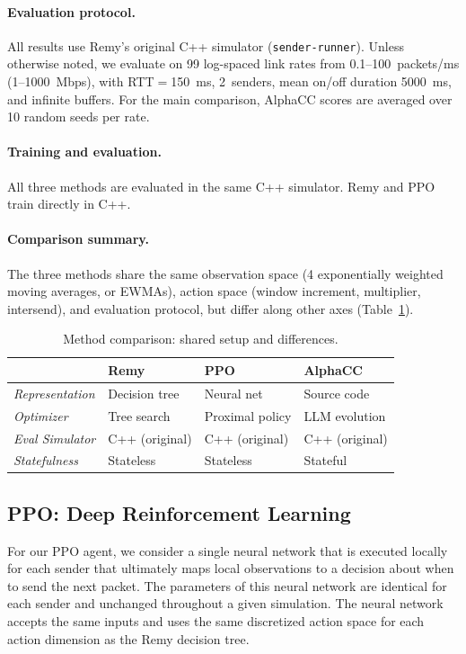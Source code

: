 \paragraph{Evaluation protocol.}
All results use Remy's original C++ simulator (\texttt{sender-runner}).
Unless otherwise noted, we evaluate on 99 log-spaced link rates from
0.1--100~packets/ms (1--1000~Mbps), with RTT${}={}$150~ms, 2~senders,
mean on/off duration 5000~ms, and infinite buffers.
For the main comparison, AlphaCC scores are averaged over 10 random
seeds per rate.

\paragraph{Training and evaluation.}
All three methods are evaluated in the same C++ simulator.
Remy and PPO train directly in C++. 

\paragraph{Comparison summary.}
The three methods share the same observation space (4 exponentially
weighted moving averages, or EWMAs), action
space (window increment, multiplier, intersend), and evaluation protocol,
but differ along other axes (Table~\ref{tab:fairness}).

\begin{table}[t]
\centering
\caption{Method comparison: shared setup and differences.}
\label{tab:fairness}
\small
\setlength{\tabcolsep}{4pt}
\begin{tabular}{@{}llll@{}}
\toprule
 & Remy & PPO & AlphaCC \\
\midrule
\textit{Representation}  & Decision tree      & Neural net        & Source code       \\
\textit{Optimizer}        & Tree search       & Proximal policy   & LLM evolution     \\
\textit{Eval Simulator}   & C++ (original)    & C++ (original)    & C++ (original)    \\
\textit{Statefulness}     & Stateless         & Stateless         & Stateful          \\
\bottomrule
\end{tabular}
\end{table}

\subsection{PPO: Deep Reinforcement Learning}
\label{sec:ppo}
For our PPO agent, we consider a single neural network that is executed
locally for each sender that ultimately maps local observations to a decision
about when to send the next packet. The parameters of this neural network are
identical for each sender and unchanged throughout a given simulation. The
neural network accepts the same inputs and uses the same discretized action
space for each action dimension as the Remy decision tree.


